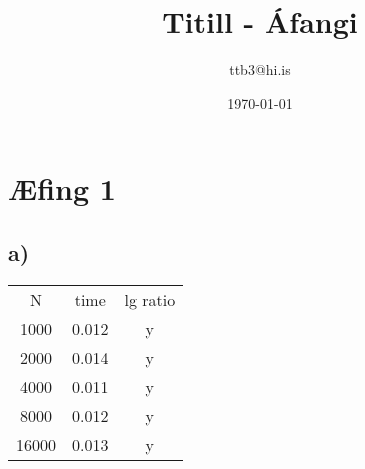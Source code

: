 \documentclass{article}
\title{Titill - Áfangi}
\author{ttb3@hi.is}
\date{\today}
\begin{document}
\maketitle


\section*{Æfing 1}
\subsection*{a)}
\begin{center}
    \begin{tabular}{|c|c|c|}
        \hline
        N&time&lg ratio\\
        1000&0.012&y\\
        2000&0.014&y\\
        4000&0.011&y\\
        8000&0.012&y\\
        16000&0.013&y\\
    \end{tabular}
\end{center}
\end{document}
